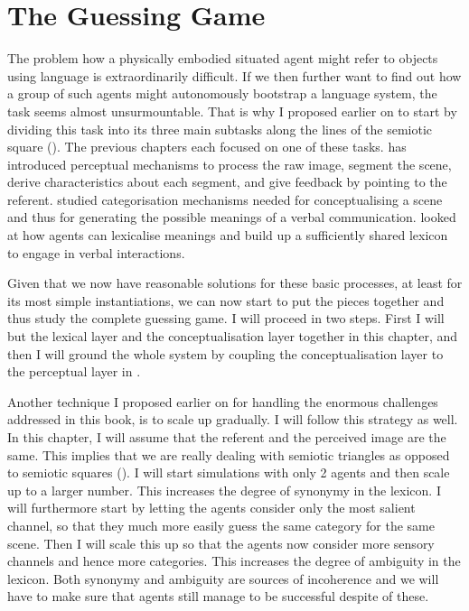 \chapter{The Guessing Game} \label{chap:6}

The problem how a physically embodied situated agent
might refer to objects using language is extraordinarily 
difficult. If we then further want to find out how 
a group of such agents might autonomously bootstrap
a language system, the task seems almost unsurmountable. 
That is why I proposed earlier on to start by dividing
this task into its three main subtasks along the lines
of the semiotic square ().
The previous chapters each focused on one of these tasks. 
 has introduced 
perceptual mechanisms to process the raw image, segment
the scene, derive characteristics about each 
segment, and give feedback by pointing to the referent. 
 studied categorisation mechanisms
needed for conceptualising a scene and thus for 
generating the possible meanings of a verbal
communication.  looked at how agents can 
lexicalise meanings and build up a sufficiently shared
lexicon to engage in verbal interactions. 

Given that we now have reasonable solutions for these
basic processes, at least for its most simple instantiations, 
we can now start to put the pieces together and thus
study the complete guessing game. I will 
proceed in two steps. First I will but the lexical 
layer and the conceptualisation layer together in 
this chapter, and then I will ground the whole system 
by coupling the conceptualisation layer to the 
perceptual layer in . 

Another technique I proposed earlier on 
for handling the enormous challenges addressed in 
this book, is to scale up 
gradually. I will follow this strategy as well. In this
chapter, I will assume that the referent and the 
perceived image are the same. This implies that we 
are really dealing with semiotic triangles as 
opposed to semiotic squares (). 
I will start simulations with only 2 agents and then 
scale up to a larger number. This increases the degree
of synonymy in the lexicon. I will furthermore
start by letting the agents 
consider only the most salient channel, so that 
they much more easily guess the same category for the 
same scene. Then I will scale this up so that 
the agents now consider more sensory channels and hence
more categories. This increases the degree of 
ambiguity in the lexicon. Both synonymy and ambiguity 
are sources of incoherence and we will have to make
sure that agents still manage to be successful 
despite of these. 

